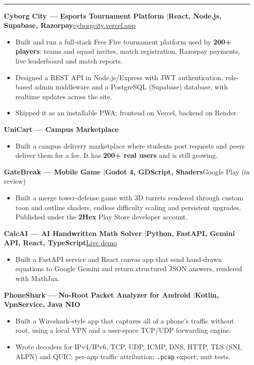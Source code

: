 \documentclass[10pt,a4paper]{article}
\renewcommand{\section}[1]{\vspace{6pt}{\large\bfseries\MakeUppercase{#1}}\\[-7pt]\rule{\textwidth}{0.6pt}\vspace{2pt}}
\newcommand{\entry}[2]{\par\textbf{#1}\hfill #2\par}
\newenvironment{points}{\vspace{-4pt}\begin{itemize}\setlength{\itemsep}{0pt}\setlength{\parskip}{0pt}\setlength{\topsep}{0pt}\setlength{\partopsep}{0pt}\setlength{\leftmargin}{12pt}}{\end{itemize}\vspace{-2pt}}
\newcommand{\sep}{\enspace$|$\enspace}
\begin{document}
\section{Projects}
\entry{Cyborg City --- Esports Tournament Platform \textnormal{\sep React, Node.js, Supabase, Razorpay}}{\href{https://cyborgcity.vercel.app}{cyborgcity.vercel.app}}
\begin{points}
  \item Built and run a full-stack Free Fire tournament platform used by \textbf{200+ players}: teams and squad invites, match registration, Razorpay payments, live leaderboard and match reports.
  \item Designed a REST API in Node.js/Express with JWT authentication, role-based admin middleware and a PostgreSQL (Supabase) database, with realtime updates across the site.
  \item Shipped it as an installable PWA; frontend on Vercel, backend on Render.
\end{points}
\entry{UniCart --- Campus Marketplace}{}
\begin{points}
  \item Built a campus delivery marketplace where students post requests and peers deliver them for a fee. It has \textbf{200+ real users} and is still growing.
\end{points}
\entry{GateBreak --- Mobile Game \textnormal{\sep Godot 4, GDScript, Shaders}}{Google Play (in review)}
\begin{points}
  \item Built a merge tower-defense game with 3D turrets rendered through custom toon and outline shaders, endless difficulty scaling and persistent upgrades. Published under the \textbf{2Hex} Play Store developer account.
\end{points}
\entry{CalcAI --- AI Handwritten Math Solver \textnormal{\sep Python, FastAPI, Gemini API, React, TypeScript}}{\href{https://calcai-50046872763.development.catalystappsail.in}{Live demo}}
\begin{points}
  \item Built a FastAPI service and React canvas app that send hand-drawn equations to Google Gemini and return structured JSON answers, rendered with MathJax.
\end{points}
\entry{PhoneShark --- No-Root Packet Analyzer for Android \textnormal{\sep Kotlin, VpnService, Java NIO}}{}
\begin{points}
  \item Built a Wireshark-style app that captures all of a phone's traffic without root, using a local VPN and a user-space TCP/UDP forwarding engine.
  \item Wrote decoders for IPv4/IPv6, TCP, UDP, ICMP, DNS, HTTP, TLS (SNI, ALPN) and QUIC; per-app traffic attribution; \texttt{.pcap} export; unit tests.
\end{points}
\end{document}

